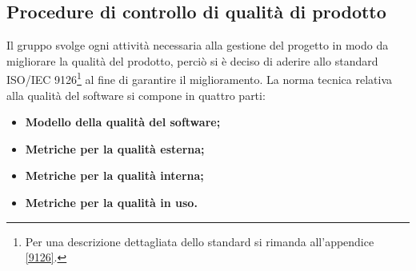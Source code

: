 \subsection{Procedure di controllo di qualità di prodotto}
Il gruppo svolge ogni attività necessaria alla gestione del progetto in modo da migliorare la qualità del prodotto, perciò si è deciso di aderire allo standard ISO/IEC 9126\footnote{Per una descrizione dettagliata dello standard si rimanda all'appendice \ref{9126}.} al fine di garantire il miglioramento. La norma tecnica relativa alla qualità del software si compone in quattro parti:
\begin{itemize}
	\item \textbf{Modello della qualità del software;}
	\item \textbf{Metriche per la qualità esterna;}
	\item \textbf{Metriche per la qualità interna;}
	\item \textbf{Metriche per la qualità in uso.}
\end{itemize}